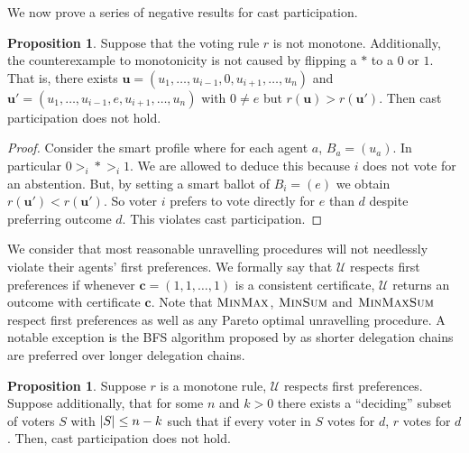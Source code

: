 \documentclass[11pt,a4paper, titlepage]{article}
\DeclarePairedDelimiter\abs{\lvert}{\rvert}
\theoremstyle{definition}
\newtheorem{proposition}[theorem]{Proposition}
\let\vec\mathbf
\begin{document}
We now prove a series of negative results for cast participation.



\begin{proposition} Suppose that the voting rule $r$ is not monotone. Additionally, the counterexample to monotonicity is not caused by flipping a $*$ to a $0$ or $1$. 
That is, there exists $\vec{u} = (u_1, \ldots, u_{i-1}, 0, u_{i+1}, \ldots, u_n)$ and $\vec{u}' = (u_1, \ldots, u_{i-1}, e, u_{i+1}, \ldots, u_n)$ with $0 \neq e$ but $r(\vec{u}) > r(\vec{u}')$. 
Then cast participation does not hold.
\end{proposition}

\begin{proof}
    Consider the smart profile where for each agent $a$, $B_a = (u_a)$. 
    In particular $0 >_i * >_i 1$. We are allowed to deduce this because $i$ does not vote for an abstention.
    But, by setting a smart ballot of $B_i = (e)$ we obtain $r(\vec{u}') < r(\vec{u}')$. So voter $i$ prefers to vote directly for $e$ than $d$ despite preferring outcome $d$.
    This violates cast participation.
\end{proof}

We consider that most reasonable unravelling procedures will not needlessly violate their agents' first preferences. 
We formally say that $\mathcal{U}$ respects first preferences if whenever $\vec{c} = (1, 1, \ldots, 1)$ is a consistent certificate, $\mathcal{U}$ returns an outcome with certificate $\vec{c}$. 
Note that $\textsc{MinMax}$, $\textsc{MinSum}$ and $\textsc{MinMaxSum}$ respect first preferences as well as any Pareto optimal unravelling procedure. A notable exception is the BFS algorithm proposed by \citeauthor{kotsialou} as shorter delegation chains are preferred over longer delegation chains.

\begin{proposition}
    Suppose $r$ is a monotone rule, $\mathcal{U}$ respects first preferences. Suppose additionally, that for some $n$ and $k > 0$ there exists a ``deciding'' subset of voters $S$ with $\abs{S} \leq n - k$ such that if every voter in $S$ votes for $d$, $r$ votes for $d$.
    Then, cast participation does not hold.
\end{proposition}
\end{document}
